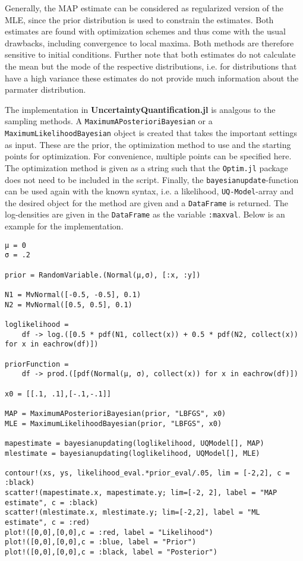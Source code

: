 Generally, the MAP estimate can be considered as regularized version of the MLE, since the prior distribution is used to constrain the estimates. Both estimates are found with optimization schemes and thus come with the usual drawbacks, including convergence to local maxima. Both methods are therefore sensitive to initial conditions. Further note that both estimates do not calculate the mean but the mode of the respective distributions, i.e. for distributions that have a high variance these estimates do not provide much information about the parmater distribution.



The implementation in \textbf{UncertaintyQuantification.jl} is analgous to the sampling methods. A \texttt{MaximumAPosterioriBayesian} or a \texttt{MaximumLikelihoodBayesian} object is created that takes the important settings as input. These are the prior, the optimization method to use and the starting points for optimization. For convenience, multiple points can be specified here. The optimization method is given as a string such that the \texttt{Optim.jl} package does not need to be included in the script. Finally, the \texttt{bayesianupdate}-function can be used again with the known syntax, i.e. a likelihood, \texttt{UQ-Model}-array and the desired object for the method are given and a \texttt{DataFrame} is returned. The log-densities are given in the \texttt{DataFrame} as the variable \texttt{:maxval}. Below is an example for the implementation.




\begin{verbatim}
μ = 0
σ = .2

prior = RandomVariable.(Normal(μ,σ), [:x, :y])

N1 = MvNormal([-0.5, -0.5], 0.1)
N2 = MvNormal([0.5, 0.5], 0.1)

loglikelihood =
    df -> log.([0.5 * pdf(N1, collect(x)) + 0.5 * pdf(N2, collect(x)) for x in eachrow(df)])

priorFunction =
    df -> prod.([pdf(Normal(μ, σ), collect(x)) for x in eachrow(df)])

x0 = [[.1, .1],[-.1,-.1]]

MAP = MaximumAPosterioriBayesian(prior, "LBFGS", x0)
MLE = MaximumLikelihoodBayesian(prior, "LBFGS", x0)

mapestimate = bayesianupdating(loglikelihood, UQModel[], MAP)
mlestimate = bayesianupdating(loglikelihood, UQModel[], MLE)

contour!(xs, ys, likelihood_eval.*prior_eval/.05, lim = [-2,2], c = :black)
scatter!(mapestimate.x, mapestimate.y; lim=[-2, 2], label = "MAP estimate", c = :black)
scatter!(mlestimate.x, mlestimate.y; lim=[-2,2], label = "ML estimate", c = :red)
plot!([0,0],[0,0],c = :red, label = "Likelihood")
plot!([0,0],[0,0],c = :blue, label = "Prior")
plot!([0,0],[0,0],c = :black, label = "Posterior")
\end{verbatim}


